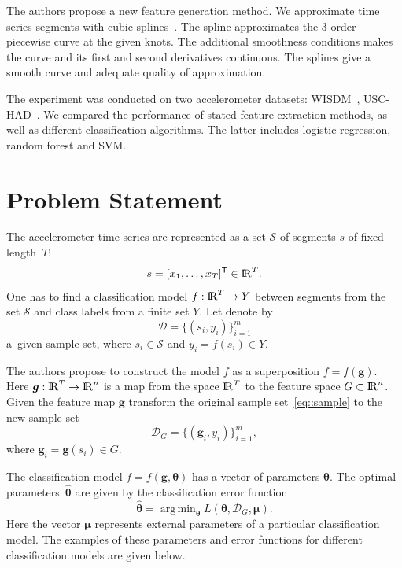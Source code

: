 \documentclass{llncs}
\DeclareMathOperator*{\argmin}{arg\,min}
\newcommand{\T}{{\mbox{\scriptsize\sffamily\upshape\mdseries T}}}
\begin{document}
The authors propose a new feature generation method. 
We approximate time series segments with cubic splines~\cite{deboor1978splines}. 
The spline approximates the 3-order piecewise curve at the given knots. The additional smoothness conditions makes the curve and its first and second derivatives continuous. The splines give a smooth curve and adequate quality of approximation.

The experiment was conducted on two accelerometer datasets: WISDM~\cite{wisdm}, USC-HAD~\cite{usc}. 
We compared the performance of stated feature extraction methods, as well as different classification algorithms. 
The latter includes logistic regression, random forest and SVM.

\section{Problem Statement}
The accelerometer time series are represented as a set $\mathcal{S}$ of segments $s$ of fixed length~$T$:
\begin{equation}
s = [x_1, \dots, x_T]^{\T} \in \bbbr^T.
\label{eq::time_series}
\end{equation}
One has to find a classification model $f: {\rm I\!R}^T \rightarrow Y$ between segments from the set $\mathcal{S}$ and class labels from a finite set $Y$.
Let denote by 
\begin{equation}
	\mathcal{D} = \{(s_i, y_i)\}_{i=1}^m
	\label{eq::sample}
\end{equation}
a~given sample set, where $s_i \in \mathcal{S}$ and $y_i = f(s_i)\in Y$.

The authors propose to construct the model $f$ as a superposition $f=f(\bm{g})$.
Here $\bm{g}: {\rm I\!R}^T \rightarrow {\rm I\!R}^n$ is a map from the space ${\rm I\!R}^{T} $ to the feature space $G \subset {\rm I\!R}^n$.
Given the feature map $\bm{g}$ transform the original sample set~\eqref{eq::sample} to the new sample set
\[
	\mathcal{D}_G = \{(\bm{g}_i, y_i)\}_{i=1}^m,
\]
where $\bm{g}_i = \bm{g}(s_i) \in G$. 

The classification model $f=f(\bm{g}, \bm{\theta})$ has a vector of parameters $\boldsymbol{\theta}$. 
The optimal parameters~$\hat{\bm{\theta}}$ are given by the classification error function
\begin{equation}
\hat{\bm{\theta}} = \argmin_{\bm{\theta}} L(\bm{\theta}, \mathcal{D}_G, \bm{\mu}).
\label{eq::optimal_classification_params}
\end{equation}
Here the vector $\bm{\mu}$ represents external parameters of a particular classification model. The examples of these parameters and error functions for different classification models are given below.
\end{document}

